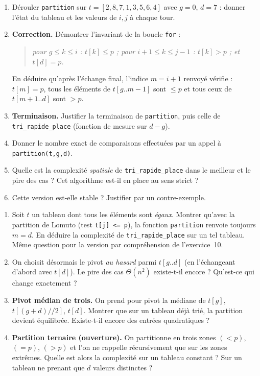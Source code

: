 \documentclass[11pt,a4paper]{article}
\begin{document}
\begin{enumerate}[label=\arabic*.,leftmargin=*]
  \item Dérouler \texttt{partition} sur $t=[2,8,7,1,3,5,6,4]$ avec $g=0$, $d=7$ :
        donner l'état du tableau et les valeurs de $i,j$ à chaque tour.
  \item \textbf{Correction.} Démontrer l'invariant de la boucle \texttt{for} :
        \begin{quote}
          \emph{pour $g\le k\le i$ : $t[k]\le p$ ; \quad pour $i+1\le k\le j-1$ :
          $t[k]>p$ ; \quad et $t[d]=p$.}
        \end{quote}
        En déduire qu'après l'échange final, l'indice $m=i+1$ renvoyé vérifie :
        $t[m]=p$, tous les éléments de $t[g..m-1]$ sont $\le p$ et tous ceux de
        $t[m+1..d]$ sont $>p$.
  \item \textbf{Terminaison.} Justifier la terminaison de \texttt{partition}, puis celle
        de \texttt{tri\_rapide\_place} (fonction de mesure sur $d-g$).
  \item Donner le nombre exact de comparaisons effectuées par un appel à
        \texttt{partition(t,g,d)}.
  \item Quelle est la complexité \emph{spatiale} de \texttt{tri\_rapide\_place} dans le
        meilleur et le pire des cas ? Cet algorithme est-il en place au sens strict ?
  \item Cette version est-elle stable ? Justifier par un contre-exemple.
\end{enumerate}

\begin{enumerate}[label=\arabic*.,leftmargin=*]
  \item Soit $t$ un tableau dont tous les éléments sont \emph{égaux}. Montrer qu'avec la
        partition de Lomuto (test \texttt{t[j] <= p}), la fonction \texttt{partition}
        renvoie toujours $m=d$. En déduire la complexité de
        \texttt{tri\_rapide\_place} sur un tel tableau. Même question pour la version
        par compréhension de l'exercice~10.
  \item On choisit désormais le pivot \emph{au hasard} parmi $t[g..d]$ (en l'échangeant
        d'abord avec $t[d]$). Le pire des cas $\Theta(n^2)$ existe-t-il encore ?
        Qu'est-ce qui change exactement ?
  \item \textbf{Pivot médian de trois.} On prend pour pivot la médiane de
        $t[g]$, $t[(g+d)//2]$, $t[d]$. Montrer que sur un tableau déjà trié, la
        partition devient équilibrée. Existe-t-il encore des entrées quadratiques ?
  \item \textbf{Partition ternaire (ouverture).} On partitionne en trois zones
        $(<p)$, $(=p)$, $(>p)$ et l'on ne rappelle récursivement que sur les zones
        extrêmes. Quelle est alors la complexité sur un tableau constant ?
        Sur un tableau ne prenant que $d$ valeurs distinctes ?
\end{enumerate}
\end{document}
